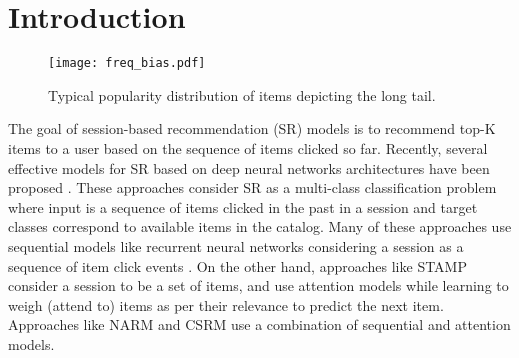 \documentclass[sigconf]{acmart}
\begin{document}
\fi
{}

\maketitle

\section{Introduction}
\begin{figure}
	\centering
	\texttt{[image: freq\_bias.pdf]}
	\vspace{-2mm}
	\caption{Typical popularity distribution of items depicting the long tail.\label{fig:freq_bias}}
	\vspace{-4mm}
\end{figure}

The goal of session-based recommendation (SR) models is to recommend top-K items to a user based on the sequence of items clicked so far.
Recently, several effective models for SR based on deep neural networks architectures have been proposed \cite{wu2018session,liu2018stamp,li2017neural,wang2019collaborative}.
These approaches consider SR as a multi-class classification problem where input is a sequence of items clicked in the past in a session and target classes correspond to available items in the catalog. 
Many of these approaches use sequential models like recurrent neural networks considering a session as a sequence of item click events \cite{hidasi2015session,jannach2017recurrent,wang2019collaborative}.
On the other hand, approaches like STAMP \cite{liu2018stamp} consider a session to be a set of items, and use attention models while learning to weigh (attend to) items as per their relevance to predict the next item.
Approaches like NARM \cite{li2017neural} and CSRM \cite{wang2019collaborative} use a combination of sequential and attention models.
\end{document}
